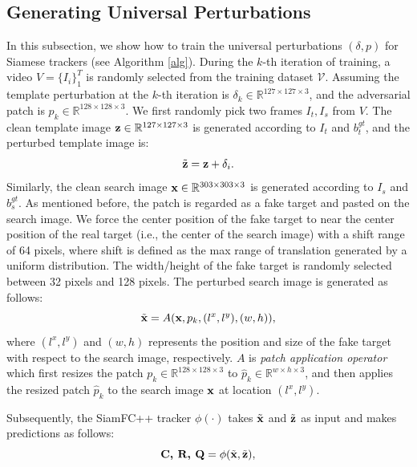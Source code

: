 \documentclass{article}
\begin{document}
\subsection{Generating Universal Perturbations}

In this subsection, we show how to train the universal perturbations $(\delta, p)$ for Siamese trackers (see Algorithm \ref{alg}).
During the $k$-th iteration of training, a video $V=\{I_i\}_1^T$ is randomly selected from the training dataset $\mathcal V$. Assuming the template perturbation at the $k$-th iteration is $\delta_k \in \mathbb{R}^{127\times 127 \times 3}$, and the adversarial patch is $p_k \in \mathbb{R}^{128\times 128\times 3}$. We first randomly pick two frames $I_t, I_s$ from $V$.
The clean template image $\textbf z\in \mathbb{R}^{127\times 127 \times 3}$ is generated according to $I_t$ and $b^{gt}_t$, and the perturbed template image is:
\begin{equation}
\tilde {\textbf z} = \textbf z + \delta_i.
\end{equation}
Similarly, the clean search image $\textbf x \in \mathbb{R}^{303\times 303 \times 3}$ is generated according to $I_s$ and $b^{gt}_s$.
As mentioned before, the patch is regarded as a fake target and pasted on the search image. We force the center position of the fake target to near the center position of the real target (i.e., the center of the search image) with a shift range of 64 pixels, where shift is defined as the max range of translation generated by a uniform distribution.
The width/height of the fake target is randomly selected between 32 pixels and 128 pixels.
The perturbed search image is generated as follows:
\begin{equation}
\tilde{\textbf x} = A(\textbf x, p_k, (l^x, l^y), (w, h)),
\end{equation}
where $(l^x, l^y)$ and $(w, h)$ represents the position and size of the fake target with respect to the search image, respectively. $A$ is \textit{patch application operator} \cite{patch} which first resizes the patch $p_k \in \mathbb{R}^{128\times 128\times 3}$ to $\hat{p}_k \in \mathbb{R}^{w\times h\times 3}$, and then applies the resized patch $\hat{p}_k$ to the search image $\textbf x$ at location $(l^x,l^y)$.

Subsequently, the SiamFC++ tracker $\phi(\cdot)$ takes $\tilde {\textbf x}$ and $\tilde{\textbf  z}$ as input and makes predictions as follows:
\begin{equation}
\textbf{C, R, Q} = \phi(\tilde {\textbf x}, \tilde{\textbf z}),
\end{equation}
\end{document}

